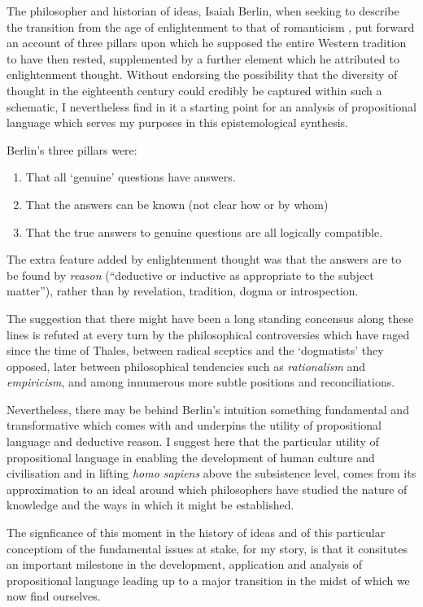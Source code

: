﻿
The philosopher and historian of ideas, Isaiah Berlin, when seeking to describe the transition from the age of enlightenment to that of romanticism \cite{berlinRR}, put forward an account of three pillars upon which he supposed the entire Western tradition to have then rested, supplemented by a further element which he attributed to enlightenment thought.
Without endorsing the possibility that the diversity of thought in the eighteenth century could credibly be captured within such a schematic, I nevertheless find in it a starting point for an analysis of propositional language which serves my purposes in this epistemological synthesis.

Berlin's three pillars were:

\begin{enumerate}
\item That all `genuine' questions have answers.

\item That the answers can be known (not clear how or by whom)

\item That the true answers to genuine questions are all logically compatible.
\end{enumerate}

The extra feature added by enlightenment thought was that the answers are to be found by \emph{reason} (``deductive or inductive as appropriate to the subject matter''), rather than by revelation, tradition, dogma or introspection.

The suggestion that there might have been a long standing concensus along these lines is refuted at every turn by the philosophical controversies which have raged since the time of Thales, between radical sceptics and the `dogmatists' they opposed, later between philosophical tendencies such as \emph{rationalism} and \emph{empiricism}, and among innumerous more subtle positions and reconciliations.

Nevertheless, there may be behind Berlin's intuition something fundamental and transformative which comes with and underpins the utility of propositional language and deductive reason.
I suggest here that the particular utility of propositional language in enabling the development of human culture and civilisation and in lifting \emph{homo sapiens} above the subsistence level, comes from its approximation to an ideal around which philosophers have studied the nature of knowledge and the ways in which it might be established.

The signficance of this moment in the history of ideas and of this particular conceptiom of the fundamental issues at stake, for my story, is that it consitutes an important milestone in the development, application and analysis of propositional language leading up to a major transition in the midst of which we now find ourselves.

